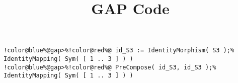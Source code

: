 \documentclass[12pt]{amsart}
\title{GAP Code}
\author{}
\begin{document}
\maketitle

\begin{Verbatim}[commandchars=!@\%,frame=single]
!color@blue%@gap>%!color@red%@ id_S3 := IdentityMorphism( S3 );%
IdentityMapping( Sym( [ 1 .. 3 ] ) )
!color@blue%@gap>%!color@red%@ PreCompose( id_S3, id_S3 );%
IdentityMapping( Sym( [ 1 .. 3 ] ) )
\end{Verbatim}
\end{document}
